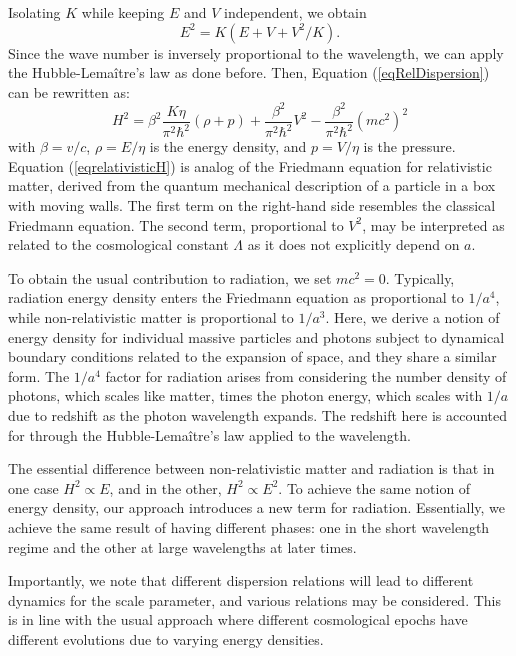 \documentclass[sn-mathphys-num]{sn-jnl}%
\begin{document}
Isolating $K$ while keeping $E$ and $V$ independent, we obtain 
\begin{equation}
E^{2}=K(E+V+V^{2}/K).\label{E2expanded}
\end{equation}
Since the wave number is inversely proportional to the wavelength, we can apply the Hubble-Lemaître's law as done before.  Then, Equation (\ref{eqRelDispersion}) can be rewritten as:
\begin{equation}
H^{2}=\beta^{2}\frac{K\eta}{\pi^{2}\hbar^{2}}(\rho+p)+\frac{\beta^{2}}{\pi^{2}\hbar^{2}}V^{2}-\frac{\beta^{2}}{\pi^{2}\hbar^{2}}(mc^{2})^{2}\label{eqrelativisticH}
\end{equation}
with $\beta=v/c$, $\rho = E/\eta$ is the energy density, and $p = V/\eta$ is the pressure. Equation (\ref{eqrelativisticH}) is analog of the Friedmann equation for relativistic matter, derived from the quantum mechanical description of a particle in a box with moving walls. The first term on the right-hand side resembles the classical Friedmann equation. The second term, proportional to $V^2$, may be interpreted as related to the cosmological constant $\Lambda$ as it does not explicitly depend on $a$.


To obtain the usual contribution to radiation, we set $mc^2 = 0$. Typically, radiation energy density enters the Friedmann equation as proportional to $1/a^4$, while non-relativistic matter is proportional to $1/a^3$. Here, we derive a notion of energy density for individual massive particles and photons subject to dynamical boundary conditions related to the expansion of space, and they share a similar form. The $1/a^4$ factor for radiation arises from considering the number density of photons, which scales like matter, times the photon energy, which scales with $1/a$ due to redshift as the photon wavelength expands. The redshift here is accounted for through the Hubble-Lemaître's law applied to the wavelength.

The essential difference between non-relativistic matter and radiation is that in one case $H^2 \propto E$, and in the other, $H^2 \propto E^2$. To achieve the same notion of energy density, our approach introduces a new term for radiation. Essentially, we achieve the same result of having different phases: one in the short wavelength regime and the other at large wavelengths at later times.

Importantly, we note that different dispersion relations will lead to different dynamics for the scale parameter, and various relations may be considered. This is in line with the usual approach where different cosmological epochs have different evolutions due to varying energy densities. 
\end{document}
